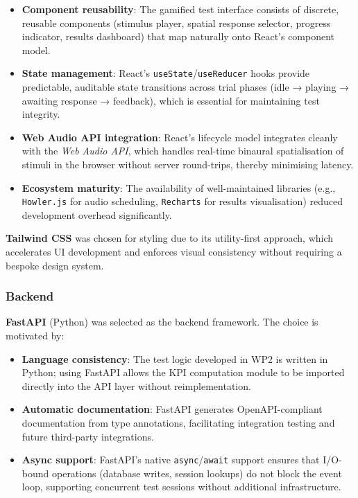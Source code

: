 \begin{itemize}
    \item \textbf{Component reusability}: The gamified test interface consists of discrete,
    reusable components (stimulus player, spatial response selector, progress indicator,
    results dashboard) that map naturally onto React's component model.
    \item \textbf{State management}: React's \texttt{useState}/\texttt{useReducer} hooks
    provide predictable, auditable state transitions across trial phases (idle → playing →
    awaiting response → feedback), which is essential for maintaining test integrity.
    \item \textbf{Web Audio API integration}: React's lifecycle model integrates cleanly
    with the \textit{Web Audio API}, which handles real-time binaural spatialisation of
    stimuli in the browser without server round-trips, thereby minimising latency.
    \item \textbf{Ecosystem maturity}: The availability of well-maintained libraries
    (e.g., \texttt{Howler.js} for audio scheduling, \texttt{Recharts} for results
    visualisation) reduced development overhead significantly.
\end{itemize}

\textbf{Tailwind CSS} was chosen for styling due to its utility-first approach, which
accelerates UI development and enforces visual consistency without requiring a bespoke
design system.

\subsubsection{Backend}

\textbf{FastAPI} (Python) was selected as the backend framework. The choice is motivated by:

\begin{itemize}
    \item \textbf{Language consistency}: The test logic developed in WP2 is written in
    Python; using FastAPI allows the KPI computation module to be imported directly into
    the API layer without reimplementation.
    \item \textbf{Automatic documentation}: FastAPI generates OpenAPI-compliant
    documentation from type annotations, facilitating integration testing and future
    third-party integrations.
    \item \textbf{Async support}: FastAPI's native \texttt{async}/\texttt{await} support
    ensures that I/O-bound operations (database writes, session lookups) do not block
    the event loop, supporting concurrent test sessions without additional infrastructure.
\end{itemize}

